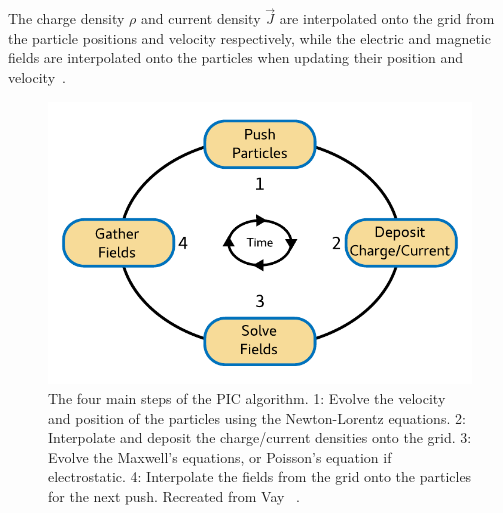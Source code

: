 The charge density $\rho$ and current density $\vec{J}$ are interpolated onto the grid from the particle positions and velocity respectively, while the electric and magnetic fields are interpolated onto the particles when updating their position and velocity~\cite{vay:2016}.

\begin{figure}[hbt]
    \centering
    \includegraphics[width=0.7\linewidth]{figures/PIC-Diagram}
    \caption{\label{Fig:PIC}
        The four main steps of the PIC algorithm.
        1: Evolve the velocity and position of the particles using the Newton-Lorentz equations.
        2: Interpolate and deposit the charge/current densities onto the grid.
        3: Evolve the Maxwell's equations, or Poisson's equation if electrostatic.
        4: Interpolate the fields from the grid onto the particles for the next push.
        Recreated from Vay \etal~\cite{vay:2016}.
    }
\end{figure}

